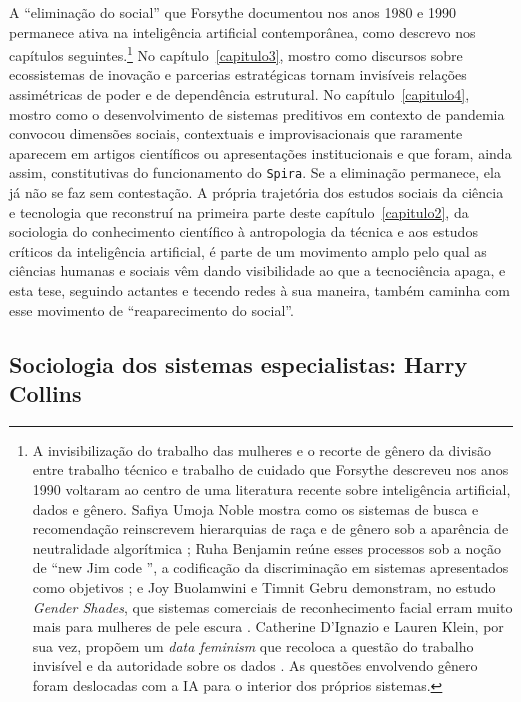A \enquote{eliminação do social} que Forsythe documentou nos anos 1980 e 1990 permanece ativa na inteligência artificial contemporânea, como descrevo nos capítulos seguintes.\footnote{A invisibilização do trabalho das mulheres e o recorte de gênero da divisão entre trabalho técnico e trabalho de cuidado que Forsythe descreveu nos anos 1990 voltaram ao centro de uma literatura recente sobre inteligência artificial, dados e gênero. Safiya Umoja Noble mostra como os sistemas de busca e recomendação reinscrevem hierarquias de raça e de gênero sob a aparência de neutralidade algorítmica \parencite{Noble2018Algorithms}; Ruha Benjamin reúne esses processos sob a noção de \enquote{new Jim code }, a codificação da discriminação em sistemas apresentados como objetivos \parencite{Benjamin2019RaceAfter}; e Joy Buolamwini e Timnit Gebru demonstram, no estudo \textit{Gender Shades}, que sistemas comerciais de reconhecimento facial erram muito mais para mulheres de pele escura \parencite{BuolamwiniGebru2018GenderShades}. Catherine D'Ignazio e Lauren Klein, por sua vez, propõem um \emph{data feminism} que recoloca a questão do trabalho invisível e da autoridade sobre os dados \parencite{DIgnazioKlein2020DataFeminism}. As questões envolvendo gênero foram deslocadas com a IA para o interior dos próprios sistemas.} No capítulo~\ref{capitulo3}, mostro como discursos sobre ecossistemas de inovação e parcerias estratégicas tornam invisíveis relações assimétricas de poder e de dependência estrutural. No capítulo~\ref{capitulo4}, mostro como o desenvolvimento de sistemas preditivos em contexto de pandemia convocou dimensões sociais, contextuais e improvisacionais que raramente aparecem em artigos científicos ou apresentações institucionais e que foram, ainda assim, constitutivas do funcionamento do \texttt{Spira}. Se a eliminação permanece, ela já não se faz sem contestação. A própria trajetória dos estudos sociais da ciência e tecnologia que reconstruí na primeira parte deste capítulo~\ref{capitulo2}, da sociologia do conhecimento científico à antropologia da técnica e aos estudos críticos da inteligência artificial, é parte de um movimento amplo pelo qual as ciências humanas e sociais vêm dando visibilidade ao que a tecnociência apaga, e esta tese, seguindo actantes e tecendo redes à sua maneira, também caminha com esse movimento de \enquote{reaparecimento do social}.

\subsection{Sociologia dos sistemas especialistas: Harry Collins}

